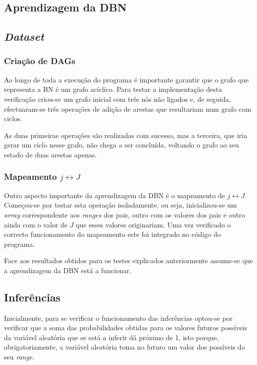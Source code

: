 \documentclass[10pt]{article}
\numberwithin{equation}{section}
\begin{document}
\subsection{Aprendizagem da DBN}

\subsection{\textit{Dataset}}


\subsubsection{Criação de DAGs}

Ao longo de toda a execução do programa é importante garantir que o grafo que representa a BN é um grafo acíclico. Para testar a implementação desta verificação criou-se um grafo inicial com três nós não ligados e, de seguida, efectuaram-se três operações de adição de arestas que resultariam num grafo com ciclos. 

As duas primeiras operações são realizadas com sucesso, mas a terceira, que iria gerar um ciclo nesse grafo, não chega a ser concluída, voltando o grafo ao seu estado de duas arestas apenas. 

\subsubsection{Mapeamento $j \leftrightarrow J$}

Outro aspecto importante da aprendizagem da DBN é o mapeamento de $j \leftrightarrow J$. Começou-se por testar esta operação isoladamente, ou seja, inicializou-se um \textit{array} correspondente aos \textit{ranges} dos pais, outro com os valores dos pais e outro ainda com o valor de $J$ que esses valores originariam. Uma vez verificado o correcto funcionamento do mapeamento este foi integrado no código do programa.

Face aos resultados obtidos para os testes explicados anteriormente assume-se que a aprendizagem da DBN está a funcionar.

\subsection{Inferências}

Inicialmente, para se verificar o funcionamento das inferências optou-se por verificar que a soma das probabilidades obtidas para os valores futuros possíveis da variável aleatória que se está a inferir dá próximo de 1, isto porque, obrigatoriamente, a variável aleatória toma no futuro um valor dos possíveis do seu \textit{range}. 
\end{document}
